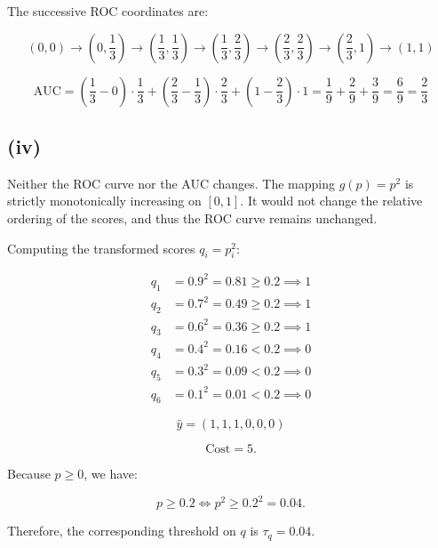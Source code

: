 \documentclass[11pt]{article}
\begin{document}
The successive ROC coordinates are:

$$
(0, 0)
\to \left(0, \frac{1}{3}\right)
\to \left(\frac{1}{3}, \frac{1}{3}\right)
\to \left(\frac{1}{3}, \frac{2}{3}\right)
\to \left(\frac{2}{3}, \frac{2}{3}\right)
\to \left(\frac{2}{3}, 1\right)
\to (1, 1)
$$

$$
\text{AUC}
= \left(\frac{1}{3} - 0\right) \cdot \frac{1}{3} + \left(\frac{2}{3} - \frac{1}{3}\right) \cdot \frac{2}{3} + \left(1 - \frac{2}{3}\right) \cdot 1
= \frac{1}{9} + \frac{2}{9} + \frac{3}{9} = \frac{6}{9}
= \frac{2}{3}
$$

\subsection*{(iv)}

Neither the ROC curve nor the AUC changes. The mapping $g(p) = p^2$ is strictly monotonically increasing on $[0, 1]$. It would not change the relative ordering of the scores, and thus the ROC curve remains unchanged.

Computing the transformed scores $q_i = p_i^2$:

$$
\begin{aligned}
q_1 &= 0.9^2 = 0.81 \ge 0.2 \implies 1 \\
q_2 &= 0.7^2 = 0.49 \ge 0.2 \implies 1 \\
q_3 &= 0.6^2 = 0.36 \ge 0.2 \implies 1 \\
q_4 &= 0.4^2 = 0.16 < 0.2 \implies 0 \\
q_5 &= 0.3^2 = 0.09 < 0.2 \implies 0 \\
q_6 &= 0.1^2 = 0.01 < 0.2 \implies 0
\end{aligned}
$$

$$
\hat{y} = (1, 1, 1, 0, 0, 0)
$$

$$
\text{Cost} = 5.
$$

Because $p \ge 0$, we have:

$$
p \ge 0.2 \iff p^2 \ge 0.2^2 = 0.04.
$$

Therefore, the corresponding threshold on $q$ is $\tau_q = 0.04$.
\end{document}
